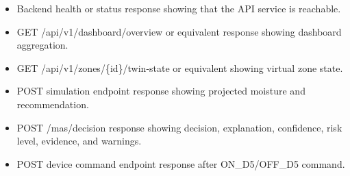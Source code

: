 \begin{itemize}

\item Backend health or status response showing that the API service is reachable.

\item GET /api/v1/dashboard/overview or equivalent response showing dashboard aggregation.

\item GET /api/v1/zones/\{id\}/twin-state or equivalent showing virtual zone state.

\item POST simulation endpoint response showing projected moisture and recommendation.

\item POST /mas/decision response showing decision, explanation, confidence, risk level, evidence, and warnings.

\item POST device command endpoint response after ON\_D5/OFF\_D5 command.

\end{itemize}
